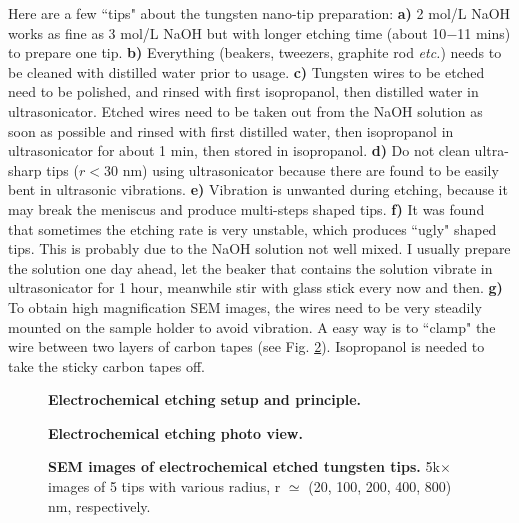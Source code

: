 Here are a few ``tips" about the tungsten nano-tip preparation: {\bf a)} 2 mol/L NaOH works as fine as 3 mol/L NaOH but with longer etching time (about 10$-$11 mins) to prepare one tip. {\bf b)} Everything (beakers, tweezers, graphite rod {\it etc.\@}) needs to be cleaned with distilled water prior to usage. {\bf c)} Tungsten wires to be etched need to be polished, and rinsed with first isopropanol, then distilled water in ultrasonicator. Etched wires need to be taken out from the NaOH solution as soon as possible and rinsed with first distilled water, then isopropanol in ultrasonicator for about 1 min, then stored in isopropanol. {\bf d)} Do not clean ultra-sharp tips ($r < 30$ nm) using ultrasonicator because there are found to be easily bent in ultrasonic vibrations. {\bf e)} Vibration is unwanted during etching, because it may break the meniscus and produce multi-steps shaped tips. {\bf f)} It was found that sometimes the etching rate is very unstable, which produces ``ugly" shaped tips. This is probably due to the NaOH solution not well mixed. I usually prepare the solution one day ahead, let the beaker that contains the solution vibrate in ultrasonicator for 1 hour, meanwhile stir with glass stick every now and then. {\bf g)} To obtain high magnification SEM images, the wires need to be very steadily mounted on the sample holder to avoid vibration. A easy way is to ``clamp" the wire between two layers of carbon tapes (see Fig. \ref{fig:etchingphoto}). Isopropanol is needed to take the sticky carbon tapes off.

\newpage
\begin{figure}[H]
	
	\centering	
	\vspace{-2mm}
	\caption[Electrochemical etching setup and principle.]{{\bf Electrochemical etching setup and principle.}}
	\label{fig:etching}	
	
\end{figure}

\begin{figure}[H]
	
	\centering
	\vspace{-7.5mm}
	\caption[Electrochemical etching photo view.]{{\bf Electrochemical etching photo view.}}
	\label{fig:etchingphoto}
		
\end{figure}

\begin{figure}[H]
	
 	\centering
    \vspace{-5.5mm}
 	\caption[SEM images of electrochemical etched tungsten tips.]{{\bf SEM images of electrochemical etched tungsten tips.} 
 		5k$\times$ images of 5 tips with various radius, r $\simeq$ (20, 100, 200, 400, 800) nm, respectively.}
 	\label{fig:tipSEMimage}	   
 	
\end{figure}

